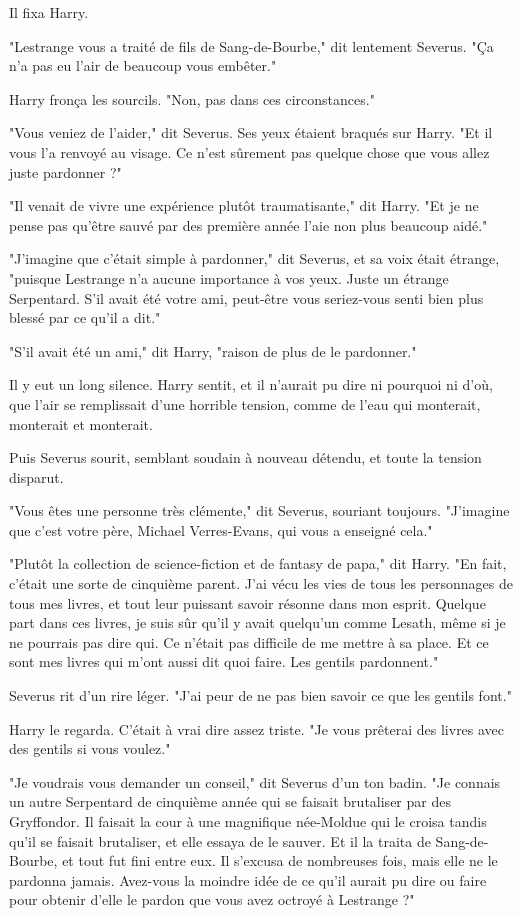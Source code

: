 Il fixa Harry.

"Lestrange vous a traité de fils de Sang-de-Bourbe," dit lentement Severus. "Ça n'a pas eu l'air de beaucoup vous embêter."

Harry fronça les sourcils. "Non, pas dans ces circonstances."

"Vous veniez de l'aider," dit Severus. Ses yeux étaient braqués sur Harry. "Et il vous l'a renvoyé au visage. Ce n'est sûrement pas quelque chose que vous allez juste pardonner ?"

"Il venait de vivre une expérience plutôt traumatisante," dit Harry. "Et je ne pense pas qu'être sauvé par des première année l'aie non plus beaucoup aidé."

"J'imagine que c'était simple à pardonner," dit Severus, et sa voix était étrange, "puisque Lestrange n'a aucune importance à vos yeux. Juste un étrange Serpentard. S'il avait été votre ami, peut-être vous seriez-vous senti bien plus blessé par ce qu'il a dit."

"S'il avait été un ami," dit Harry, "raison de plus de le pardonner."

Il y eut un long silence. Harry sentit, et il n'aurait pu dire ni pourquoi ni d'où, que l'air se remplissait d'une horrible tension, comme de l'eau qui monterait, monterait et monterait.

Puis Severus sourit, semblant soudain à nouveau détendu, et toute la tension disparut.

"Vous êtes une personne très clémente," dit Severus, souriant toujours. "J'imagine que c'est votre père, Michael Verres-Evans, qui vous a enseigné cela."

"Plutôt la collection de science-fiction et de fantasy de papa," dit Harry. "En fait, c'était une sorte de cinquième parent. J'ai vécu les vies de tous les personnages de tous mes livres, et tout leur puissant savoir résonne dans mon esprit. Quelque part dans ces livres, je suis sûr qu'il y avait quelqu'un comme Lesath, même si je ne pourrais pas dire qui. Ce n'était pas difficile de me mettre à sa place. Et ce sont mes livres qui m'ont aussi dit quoi faire. Les gentils pardonnent."

Severus rit d'un rire léger. "J'ai peur de ne pas bien savoir ce que les gentils font."

Harry le regarda. C'était à vrai dire assez triste. "Je vous prêterai des livres avec des gentils si vous voulez."

"Je voudrais vous demander un conseil," dit Severus d'un ton badin. "Je connais un autre Serpentard de cinquième année qui se faisait brutaliser par des Gryffondor. Il faisait la cour à une magnifique née-Moldue qui le croisa tandis qu'il se faisait brutaliser, et elle essaya de le sauver. Et il la traita de Sang-de-Bourbe, et tout fut fini entre eux. Il s'excusa de nombreuses fois, mais elle ne le pardonna jamais. Avez-vous la moindre idée de ce qu'il aurait pu dire ou faire pour obtenir d'elle le pardon que vous avez octroyé à Lestrange ?"

